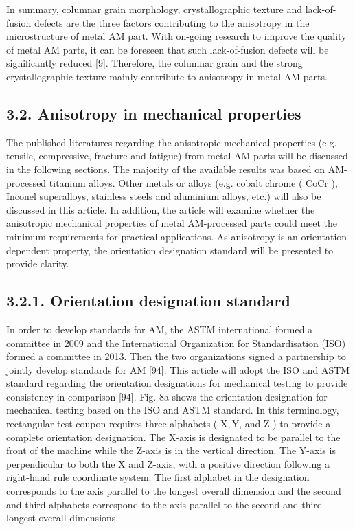 \documentclass[10pt]{article}
\begin{document}
In summary, columnar grain morphology, crystallographic texture and lack-of-fusion defects are the three factors contributing to the anisotropy in the microstructure of metal AM part. With on-going research to improve the quality of metal AM parts, it can be foreseen that such lack-of-fusion defects will be significantly reduced [9]. Therefore, the columnar grain and the strong crystallographic texture mainly contribute to anisotropy in metal AM parts.

\subsection*{3.2. Anisotropy in mechanical properties}
The published literatures regarding the anisotropic mechanical properties (e.g. tensile, compressive, fracture and fatigue) from metal AM parts will be discussed in the following sections. The majority of the available results was based on AM-processed titanium alloys. Other metals or alloys (e.g. cobalt chrome ( $\mathrm{CoCr}$ ), Inconel superalloys, stainless steels and aluminium alloys, etc.) will also be discussed in this article. In addition, the article will examine whether the anisotropic mechanical properties of metal AM-processed parts could meet the minimum requirements for practical applications. As anisotropy is an orientation-dependent property, the orientation designation standard will be presented to provide clarity.

\subsection*{3.2.1. Orientation designation standard}
In order to develop standards for AM, the ASTM international formed a committee in 2009 and the International Organization for Standardisation (ISO) formed a committee in 2013. Then the two organizations signed a partnership to jointly develop standards for AM [94]. This article will adopt the ISO and ASTM standard regarding the orientation designations for mechanical testing to provide consistency in comparison [94]. Fig. 8a shows the orientation designation for mechanical testing based on the ISO and ASTM standard. In this terminology, rectangular test coupon requires three alphabets ( $\mathrm{X}, \mathrm{Y}$, and $\mathrm{Z}$ ) to provide a complete orientation designation. The X-axis is designated to be parallel to the front of the machine while the Z-axis is in the vertical direction. The $\mathrm{Y}$-axis is perpendicular to both the $\mathrm{X}$ and $\mathrm{Z}$-axis, with a positive direction following a right-hand rule coordinate system. The first alphabet in the designation corresponds to the axis parallel to the longest overall dimension and the second and third alphabets correspond to the axis parallel to the second and third longest overall dimensions.
\end{document}
